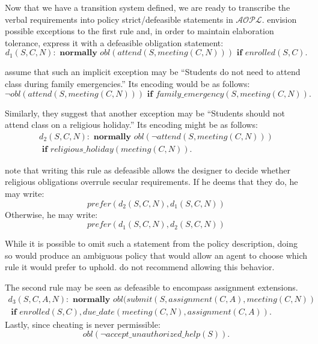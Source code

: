 Now that we have a transition system defined, we are ready to transcribe the verbal requirements into policy strict/defeasible statements in $\mathcal{AOPL}$.
\citet{gelfond_authorization_2008} envision possible exceptions to the first rule and, in order to maintain elaboration tolerance, express it with a defeasible obligation statement:
\begin{equation}
    \label{eq:aopl_example_line_1}
    d_1(S,C,N): \textbf{ normally } obl(attend(S, meeting(C, N))) \textbf{ if } enrolled(S, C).
\end{equation}

\citet{gelfond_authorization_2008} assume that such an implicit exception may be ``Students do not need to attend class during family emergencies.''
Its encoding would be as follows:
\begin{equation}
    \label{eq:aopl_example_line_2}
    \neg obl(attend(S,meeting(C, N))) \textbf{ if } family\_emergency(S,meeting(C, N)).
\end{equation}

Similarly, they suggest that another exception may be ``Students should not attend class on a religious holiday.''
Its encoding might be as follows:
\begin{multline}
    \label{eq:aopl_example_line_3}
    d_2(S,C,N): \textbf{ normally } obl(\neg attend(S, meeting(C, N))) \\
        \textbf{ if } religious\_holiday(meeting(C, N)).
\end{multline}

\citet{gelfond_authorization_2008} note that writing this rule as defeasible allows the designer to decide whether religious obligations overrule secular requirements.
If he deems that they do, he may write:
\begin{equation}
    \label{eq:aopl_example_line_4}
    prefer(d_2(S,C,N),d_1(S,C,N))
\end{equation}
Otherwise, he may write:
\begin{equation}
    \label{eq:aopl_example_line_5}
    prefer(d_1(S,C,N), d_2(S,C,N))
\end{equation}

While it is possible to omit such a statement from the policy description, doing so would produce an ambiguous policy that would allow an agent to choose which rule it would prefer to uphold.
\citet{gelfond_authorization_2008} do not recommend allowing this behavior.

The second rule may be seen as defeasible to encompass assignment extensions.
\begin{multline}
    \label{eq:aopl_example_line_6}
    d_3(S,C,A,N): \textbf{ normally } obl(submit(S,assignment(C,A),meeting(C,N)) \\ \textbf{ if } enrolled(S,C), due\_date(meeting(C,N), assignment(C,A)).
\end{multline}
Lastly, since cheating is never permissible:
\begin{equation}
    \label{eq:aopl_example_line_7}
    obl(\neg accept\_unauthorized\_help(S)).
\end{equation}

